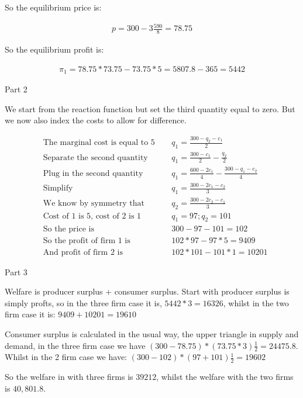 \documentclass[12pt]{report}
\numberwithin{equation}{section}
\begin{document}
So the equilibrium price is: 

\begin{align*}
p=300- 3\frac{590}{8}=78.75
\end{align*}

So the equilibrium profit is: 

\begin{align*}
\pi_1 = 78.75*73.75-73.75*5 = 5807.8-365 = 5442
\end{align*}

Part 2

We start from the reaction function but set the third quantity equal to zero. But we now also index the costs to allow for difference. 

\begin{align*}
&\text{The marginal cost is equal to 5} ~~ 
&& q_1= \frac{300-q_2-c_1}{2}
\\
&\text{Separate the second quantity} ~~ 
&& q_1= \frac{300-c_1}{2}-\frac{q_2}{2}
\\
&\text{Plug in the second quantity} ~~ 
&& q_1= \frac{600-2c_1}{4}-\frac{300-q_1-c_2}{4}
\\
&\text{Simplify} ~~ 
&& q_1= \frac{300-2c_1-c_2}{3}
\\
&\text{We know by symmetry that} ~~ 
&& q_2= \frac{300-2c_2-c_1}{3}
\\
&\text{Cost of 1 is 5, cost of 2 is 1} ~~ 
&& q_1= 97 ; q_2= 101
\\
&\text{So the price is} ~~ 
&& 300-97-101 = 102
\\
&\text{So the profit of firm 1 is} ~~ 
&& 102*97- 97*5= 9409
\\
&\text{And profit of firm 2 is} ~~ 
&& 102*101- 101*1 = 10201
\end{align*}

Part 3

Welfare is producer surplus + consumer surplus. Start with producer surplus is simply profts, so in the three firm case it is, $5442*3=16326$, whilst in the two firm case it is: $9409+10201=19610$

Consumer surplus is calculated in the usual way, the upper triangle in supply and demand, in the three firm case we have $(300-78.75)*(73.75*3)\frac{1}{2}=24475.8$. Whilst in the 2 firm case we have: $(300-102)*(97+101)\frac{1}{2}=19602$

So the welfare in with three firms is $39212$, whilst the welfare with the two firms is $40,801.8$.



\end{document}

